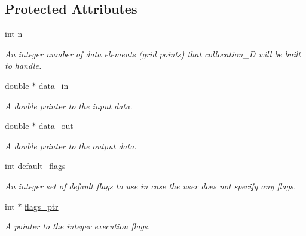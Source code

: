\subsection*{Protected Attributes}
\begin{DoxyCompactItemize}
\item 
\hypertarget{classbases_1_1explicit__plan_a6acccce0b2ef4489b411a264cab019c9}{int \hyperlink{classbases_1_1explicit__plan_a6acccce0b2ef4489b411a264cab019c9}{n}}\label{classbases_1_1explicit__plan_a6acccce0b2ef4489b411a264cab019c9}

\begin{DoxyCompactList}\small\item\em An integer number of data elements (grid points) that collocation\-\_\-D will be built to handle. \end{DoxyCompactList}\item 
\hypertarget{classbases_1_1explicit__plan_a8faf976ec6c01951dd6d5e7421630184}{double $\ast$ \hyperlink{classbases_1_1explicit__plan_a8faf976ec6c01951dd6d5e7421630184}{data\-\_\-in}}\label{classbases_1_1explicit__plan_a8faf976ec6c01951dd6d5e7421630184}

\begin{DoxyCompactList}\small\item\em A double pointer to the input data. \end{DoxyCompactList}\item 
\hypertarget{classbases_1_1explicit__plan_a55946d0b4b1a19da12469447de247b82}{double $\ast$ \hyperlink{classbases_1_1explicit__plan_a55946d0b4b1a19da12469447de247b82}{data\-\_\-out}}\label{classbases_1_1explicit__plan_a55946d0b4b1a19da12469447de247b82}

\begin{DoxyCompactList}\small\item\em A double pointer to the output data. \end{DoxyCompactList}\item 
\hypertarget{classbases_1_1plan_a756595e230cc99e84de4392ac691eefd}{int \hyperlink{classbases_1_1plan_a756595e230cc99e84de4392ac691eefd}{default\-\_\-flags}}\label{classbases_1_1plan_a756595e230cc99e84de4392ac691eefd}

\begin{DoxyCompactList}\small\item\em An integer set of default flags to use in case the user does not specify any flags. \end{DoxyCompactList}\item 
\hypertarget{classbases_1_1plan_a4f423a3831579d895a0658164bb82b8c}{int $\ast$ \hyperlink{classbases_1_1plan_a4f423a3831579d895a0658164bb82b8c}{flags\-\_\-ptr}}\label{classbases_1_1plan_a4f423a3831579d895a0658164bb82b8c}

\begin{DoxyCompactList}\small\item\em A pointer to the integer execution flags. \end{DoxyCompactList}\end{DoxyCompactItemize}


